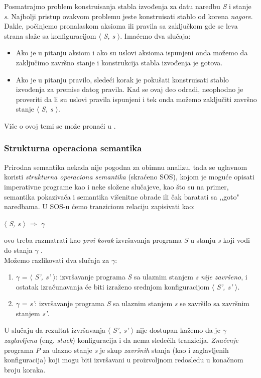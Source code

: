 \documentclass[a4paper]{article}
\begin{document}
{Posmatrajmo problem konstruisanja stabla izvođenja za datu naredbu \textit{S} i stanje \textit{s}. Najbolji pristup ovakvom problemu jeste konstruisati stablo od korena \textit{nagore}. Dakle, počinjemo pronalaskom aksioma ili pravila sa zaključkom gde se leva strana slaže sa konfiguracijom $\langle$ \textit{S, s} $\rangle$. Imaćemo dva slučaja:
\begin{itemize}
	\item Ako je u pitanju aksiom i ako su uslovi aksioma ispunjeni onda možemo da zaključimo završno stanje i konstrukcija stabla izvođenja je gotova.
	\item Ako je u pitanju pravilo, sledeći korak je pokušati konstruisati stablo izvođenja za premise datog pravila. Kad se ovaj deo odradi, neophodno je proveriti da li su uslovi pravila ispunjeni i tek onda možemo zaključiti završno stanje  $\langle$ \textit{S, s} $\rangle$.
\end{itemize}
Više o ovoj temi se može pronaći u \cite{wiley}.

\subsubsection{Strukturna operaciona semantika}
Prirodna semantika nekada nije pogodna za obimnu analizu, tada se uglavnom koristi \textit{strukturna operaciona semantika} (skraćeno SOS), kojom je moguće opisati imperativne programe kao i neke složene slučajeve, kao što su na primer, semantika pokazivača i semantika višenitne obrade ili čak baratati sa ,,goto" naredbama. U SOS-u ćemo tranzicionu relaciju zapisivati kao:
\begin{center} $\langle$ \textit{S, s} $\rangle$ $\Longrightarrow$ \textit{$\gamma$} \end{center}
ovo treba razmatrati kao {\em prvi korak} izvršavanja programa \textit{S} u stanju \textit{s} koji vodi do stanja \textit{$\gamma$} \cite{wiley}.\\
Možemo razlikovati dva slučaja za $\gamma$:
\begin{enumerate}
	\item $\gamma$ = $\langle$ \textit{S', s'} $\rangle$: izvršavanje programa \textit{S} sa ulaznim stanjem \textit{s} {\em nije završeno}, i ostatak izračunavanja će biti izraženo srednjom konfiguracijom $\langle$ \textit{S', s'} $\rangle$.
	\item $\gamma$ = \textit{s'}: izvršavanje programa \textit{S} sa ulaznim stanjem \textit{s} se završilo sa završnim stanjem \textit{s'}.
\end{enumerate}
U slučaju da rezultat izvršavanja $\langle$ \textit{S', s'} $\rangle$ nije dostupan kažemo da je $\gamma$ \textit{zaglavljena} (eng. {\em stuck}) konfiguracija i da nema sledećih tranzicija. \textit{Značenje} programa \textit{P} za ulazno stanje \textit{s} je skup \textit{završnih} stanja (kao i zaglavljenih konfiguracija) koji mogu biti izvršavani u proizvoljnom redosledu u konačnom broju koraka.

}
\end{document}
